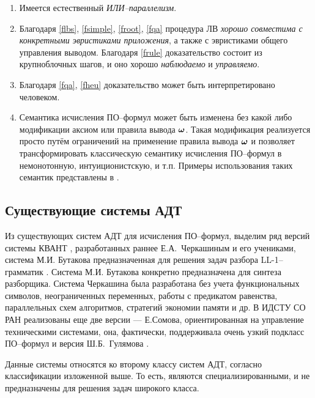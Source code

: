 \begin{enumerate}
%
\item Имеется естественный {\em ИЛИ--параллелизм}.
%
\item\label{fheu} Благодаря \ref{flbs}, \ref{fsimple}, \ref{froot}, \ref{fqa} процедура ЛВ {\em хорошо совместима с конкретными эвристиками приложения}, а также с эвристиками общего управления выводом. Благодаря \ref{frule} доказательство состоит из крупноблочных шагов, и оно хорошо {\em наблюдаемо} и {\em управляемо}.
%
\item Благодаря \ref{fqa}, \ref{fheu} доказательство может быть интерпретировано человеком.
%
\item Семантика исчисления ПО--формул может быть изменена без какой либо модификации аксиом или правила вывода $\boldsymbol{\omega}$. Такая модификация реализуется просто путём ограничений на применение правила вывода $\boldsymbol{\omega}$ и позволяет трансформировать классическую семантику исчисления ПО--формул в немонотонную, интуиционистскую, и т.п. Примеры использования таких семантик представлены в \cite{ICDS2000}.
\end{enumerate}

\subsection{Существующие системы АДТ}


Из существующих систем АДТ для исчисления ПО--формул, выделим ряд версий системы КВАНТ \cite{dissChe, Che2, QUANT4}, разработанных раннее Е.А.~Черкашиным и его учениками, система М.И. Бутакова предназначенная для решения задач разбора LL-1--грамматик \cite{Butakov1}. Система М.И. Бутакова конкретно предназначена для синтеза разборщика. Система Черкашина была разработана без учета функциональных символов, неограниченных переменных, работы с предикатом равенства, параллельных схем алгоритмов, стратегий экономии памяти и др. В ИДСТУ СО РАН реализованы еще две версии --- Е.Сомова, ориентированная на управление техническими системами, она, фактически, поддерживала очень узкий подкласс ПО--формул и версия Ш.Б.~Гулямова \cite{Gulamov}.

Данные системы относятся ко второму классу систем АДТ, согласно классификации изложенной выше. То есть, являются специализированными, и не предназначены для решения задач широкого класса.


